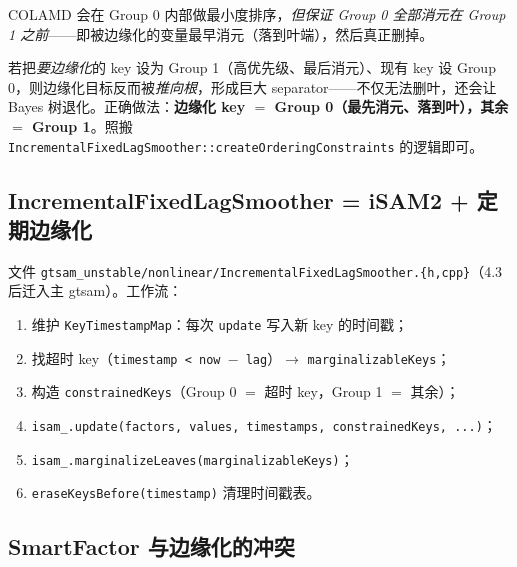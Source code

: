 \noindent COLAMD 会在 Group 0 内部做最小度排序，\emph{但保证 Group 0 全部消元在 Group 1 之前}——即被边缘化的变量最早消元（落到叶端），然后真正删掉。

\begin{pitfall}
若把\emph{要边缘化}的 key 设为 Group 1（高优先级、最后消元）、现有 key 设 Group 0，则边缘化目标反而被\emph{推向根}，形成巨大 separator——不仅无法删叶，还会让 Bayes 树退化。正确做法：\textbf{边缘化 key $=$ Group 0（最先消元、落到叶），其余 $=$ Group 1}。照搬 \texttt{IncrementalFixedLagSmoother::createOrderingConstraints} 的逻辑即可。
\end{pitfall}

\subsection{IncrementalFixedLagSmoother = iSAM2 + 定期边缘化}
\label{sec:isam-fixedlag}

文件 \texttt{gtsam\_unstable/nonlinear/IncrementalFixedLagSmoother.\{h,cpp\}}（4.3 后迁入主 gtsam）。工作流：
\begin{enumerate}
  \item 维护 \texttt{KeyTimestampMap}：每次 \texttt{update} 写入新 key 的时间戳；
  \item 找超时 key（\texttt{timestamp < now $-$ lag}）$\to$ \texttt{marginalizableKeys}；
  \item 构造 \texttt{constrainedKeys}（Group 0 $=$ 超时 key，Group 1 $=$ 其余）；
  \item \texttt{isam\_.\allowbreak update(factors, values, timestamps, constrainedKeys, ...)}；
  \item \texttt{isam\_.\allowbreak marginalizeLeaves(marginalizableKeys)}；
  \item \texttt{eraseKeysBefore(timestamp)} 清理时间戳表。
\end{enumerate}

\subsection{SmartFactor 与边缘化的冲突}
\label{sec:isam-smartfactor}

